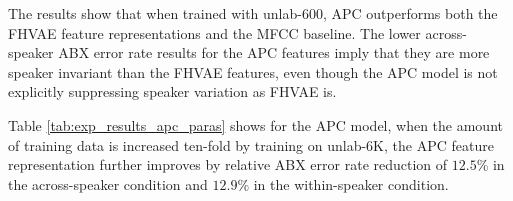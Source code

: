 \documentclass[transmag]{IEEEtran}
\begin{document}

The results show that when trained with unlab-600,  APC  outperforms both the FHVAE feature representations and the MFCC baseline. The lower across-speaker ABX error rate results for the APC features imply that they are more speaker invariant than the FHVAE features, even though the APC model is not explicitly suppressing speaker variation as FHVAE is.



Table \ref{tab:exp_results_apc_paras} shows for the APC model, when 
the amount of training data is increased ten-fold by training  on  unlab-6K, the APC feature representation further improves
by relative ABX error rate reduction of $12.5\%$ in the across-speaker condition and $12.9\%$ in the within-speaker condition.



\end{document}
